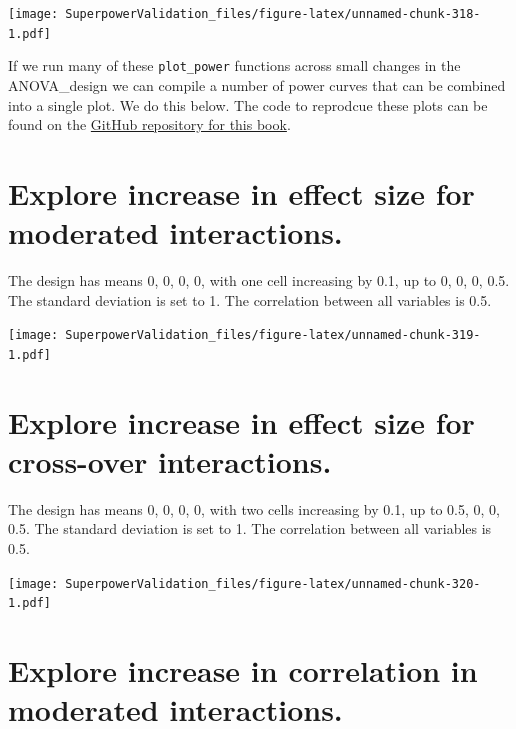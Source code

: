 \documentclass[]{book}
\newenvironment{Shaded}{\begin{snugshade}}{\end{snugshade}}
\newcommand{\DataTypeTok}[1]{\textcolor[rgb]{0.13,0.29,0.53}{#1}}
\newcommand{\DecValTok}[1]{\textcolor[rgb]{0.00,0.00,0.81}{#1}}
\newcommand{\KeywordTok}[1]{\textcolor[rgb]{0.13,0.29,0.53}{\textbf{#1}}}
\newcommand{\NormalTok}[1]{#1}
\newcommand{\OperatorTok}[1]{\textcolor[rgb]{0.81,0.36,0.00}{\textbf{#1}}}
\newcommand{\StringTok}[1]{\textcolor[rgb]{0.31,0.60,0.02}{#1}}
\begin{document}
\begin{Shaded}
\end{Shaded}

\texttt{[image: SuperpowerValidation\_files/figure-latex/unnamed-chunk-318-1.pdf]}

If we run many of these \texttt{plot\_power} functions across small changes in the ANOVA\_design we can compile a number of power curves that can be combined into a single plot. We do this below. The code to reprodcue these plots can be found on the \href{https://github.com/arcaldwell49/SuperpowerBook/tree/master/data}{GitHub repository for this book}.
\pagebreak

\hypertarget{explore-increase-in-effect-size-for-moderated-interactions.}{%
\section{Explore increase in effect size for moderated interactions.}\label{explore-increase-in-effect-size-for-moderated-interactions.}}

The design has means 0, 0, 0, 0, with one cell increasing by 0.1, up to 0, 0, 0, 0.5. The standard deviation is set to 1. The correlation between all variables is 0.5.

\texttt{[image: SuperpowerValidation\_files/figure-latex/unnamed-chunk-319-1.pdf]}
\pagebreak

\hypertarget{explore-increase-in-effect-size-for-cross-over-interactions.}{%
\section{Explore increase in effect size for cross-over interactions.}\label{explore-increase-in-effect-size-for-cross-over-interactions.}}

The design has means 0, 0, 0, 0, with two cells increasing by 0.1, up to 0.5, 0, 0, 0.5. The standard deviation is set to 1. The correlation between all variables is 0.5.

\texttt{[image: SuperpowerValidation\_files/figure-latex/unnamed-chunk-320-1.pdf]}
\pagebreak

\hypertarget{explore-increase-in-correlation-in-moderated-interactions.}{%
\section{Explore increase in correlation in moderated interactions.}\label{explore-increase-in-correlation-in-moderated-interactions.}}
\end{document}
